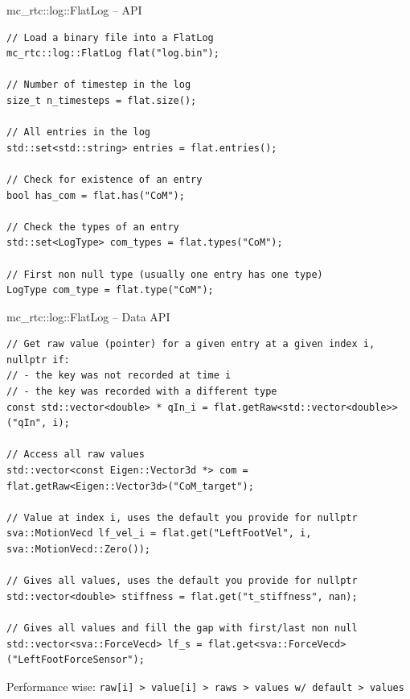 \documentclass[c,aspectratio=169]{beamer}
\begin{document}
\begin{frame}[fragile]{mc\_rtc::log::FlatLog -- API}

  \scriptsize
  \begin{block}{}
    \begin{verbatim}
// Load a binary file into a FlatLog
mc_rtc::log::FlatLog flat("log.bin");

// Number of timestep in the log
size_t n_timesteps = flat.size();

// All entries in the log
std::set<std::string> entries = flat.entries();

// Check for existence of an entry
bool has_com = flat.has("CoM");

// Check the types of an entry
std::set<LogType> com_types = flat.types("CoM");

// First non null type (usually one entry has one type)
LogType com_type = flat.type("CoM");
    \end{verbatim}
  \end{block}

\end{frame}

\begin{frame}[fragile]{mc\_rtc::log::FlatLog -- Data API}

  \scriptsize
  \begin{block}{}
    \begin{verbatim}
// Get raw value (pointer) for a given entry at a given index i, nullptr if:
// - the key was not recorded at time i
// - the key was recorded with a different type
const std::vector<double> * qIn_i = flat.getRaw<std::vector<double>>("qIn", i);

// Access all raw values
std::vector<const Eigen::Vector3d *> com = flat.getRaw<Eigen::Vector3d>("CoM_target");

// Value at index i, uses the default you provide for nullptr
sva::MotionVecd lf_vel_i = flat.get("LeftFootVel", i, sva::MotionVecd::Zero());

// Gives all values, uses the default you provide for nullptr
std::vector<double> stiffness = flat.get("t_stiffness", nan);

// Gives all values and fill the gap with first/last non null
std::vector<sva::ForceVecd> lf_s = flat.get<sva::ForceVecd>("LeftFootForceSensor");
    \end{verbatim}
  \end{block}

  \vfill

  \hfill Performance wise: \verb|raw[i] > value[i] > raws > values w/ default > values|

\end{frame}
\end{document}
